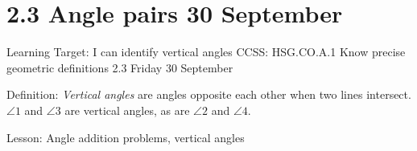 \section{2.3 Angle pairs \hfill 30 September}
\begin{frame}{Learning Target: I can identify vertical angles}
  {CCSS: HSG.CO.A.1 Know precise geometric definitions  \hfill \alert{2.3 Friday 30 September}}
  
    Definition: \emph{Vertical angles} are angles opposite each other when two lines intersect. $\angle 1$ and $\angle 3$ are vertical angles, as are $\angle 2$ and $\angle 4$.
  \begin{center}
  \end{center}
    Lesson: Angle addition problems, vertical angles
  \end{frame}
  
